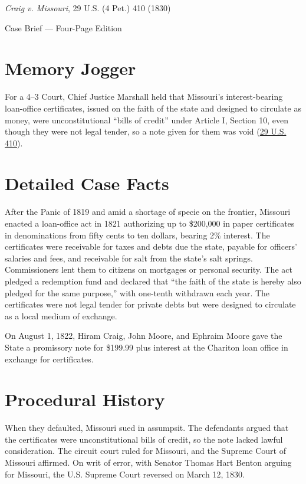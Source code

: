 \documentclass[12pt]{article}
\begin{document}
\begin{center}
{\LARGE \textit{Craig v. Missouri}, 29 U.S. (4 Pet.) 410 (1830)\par}
\vspace{0.8em}
{\large Case Brief --- Four-Page Edition\par}
\end{center}
\vspace{1em}

\section{Memory Jogger}

For a 4--3 Court, Chief Justice Marshall held that Missouri's interest-bearing loan-office certificates, issued on the faith of the state and designed to circulate as money, were unconstitutional ``bills of credit'' under Article I, Section 10, even though they were not legal tender, so a note given for them was void (\href{https://supreme.justia.com/cases/federal/us/29/410/}{29 U.S. 410}).

\section{Detailed Case Facts}

After the Panic of 1819 and amid a shortage of specie on the frontier, Missouri enacted a loan-office act in 1821 authorizing up to \$200,000 in paper certificates in denominations from fifty cents to ten dollars, bearing 2\% interest. The certificates were receivable for taxes and debts due the state, payable for officers' salaries and fees, and receivable for salt from the state's salt springs. Commissioners lent them to citizens on mortgages or personal security. The act pledged a redemption fund and declared that ``the faith of the state is hereby also pledged for the same purpose,'' with one-tenth withdrawn each year. The certificates were not legal tender for private debts but were designed to circulate as a local medium of exchange.

On August 1, 1822, Hiram Craig, John Moore, and Ephraim Moore gave the State a promissory note for \$199.99 plus interest at the Chariton loan office in exchange for certificates.

\section{Procedural History}

When they defaulted, Missouri sued in assumpsit. The defendants argued that the certificates were unconstitutional bills of credit, so the note lacked lawful consideration. The circuit court ruled for Missouri, and the Supreme Court of Missouri affirmed. On writ of error, with Senator Thomas Hart Benton arguing for Missouri, the U.S. Supreme Court reversed on March 12, 1830.
\end{document}
